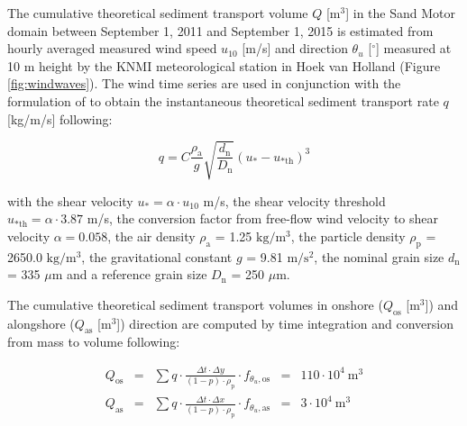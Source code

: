 \label{apx:theoretical_transport}

The cumulative theoretical sediment transport volume $Q$
[$\mathrm{m^3}$] in the Sand Motor domain between September 1, 2011
and September 1, 2015 is estimated from hourly averaged measured wind
speed $u_{10}$ [m/s] and direction $\theta_u$ [$^{\circ}$] measured at
10 m height by the KNMI meteorological station in Hoek van Holland
(Figure \ref{fig:windwaves}). The wind time series are used in
conjunction with the formulation of \citet{Bagnold1937a} to obtain the
instantaneous theoretical sediment transport rate $q$ [kg/m/s]
following:

\begin{equation}
  q = C \frac{\rho_{\mathrm{a}}}{g} \sqrt{\frac{d_{\mathrm{n}}}{D_{\mathrm{n}}}} \left(u_{\mathrm{*}} - u_{\mathrm{* th}} \right)^3
\end{equation}

\noindent with the shear velocity
$u_{\mathrm{*}} = \alpha \cdot u_{10}$ m/s, the shear velocity
threshold $u_{\mathrm{* th}} = \alpha \cdot 3.87$ m/s, the conversion
factor from free-flow wind velocity to shear velocity
$\alpha = 0.058$, the air density $\rho_{\mathrm{a}}$ = 1.25
$\mathrm{kg/m^3}$, the particle density $\rho_{\mathrm{p}}$ = 2650.0
$\mathrm{kg/m^3}$, the gravitational constant $g$ = 9.81
$\mathrm{m/s^2}$, the nominal grain size $d_{\mathrm{n}}$ = 335
$\mu \mathrm{m}$ and a reference grain size $D_{\mathrm{n}}$ = 250
$\mu \mathrm{m}$.

The cumulative theoretical sediment transport volumes in onshore
($Q_{\mathrm{os}}$ [$\mathrm{m^3}$]) and alongshore ($Q_{\mathrm{as}}$
[$\mathrm{m^3}$]) direction are computed by time integration and
conversion from mass to volume following:

\begin{equation}
  \label{eq:apx_theoretical_transport}
  \begin{array}{lclcl}
    Q_{\mathrm{os}} &=& \sum q \cdot \frac{\Delta t \cdot \Delta y}{(1 - p) \cdot \rho_{\mathrm{p}}} \cdot f_{\theta_u,\mathrm{os}} &=& 110 \cdot 10^4 ~ \mathrm{m^3} \\
    Q_{\mathrm{as}} &=& \sum q \cdot \frac{\Delta t \cdot \Delta x}{(1 - p) \cdot \rho_{\mathrm{p}}} \cdot f_{\theta_u,\mathrm{as}} &=& 3 \cdot 10^4 ~ \mathrm{m^3} \\
  \end{array}
\end{equation}

